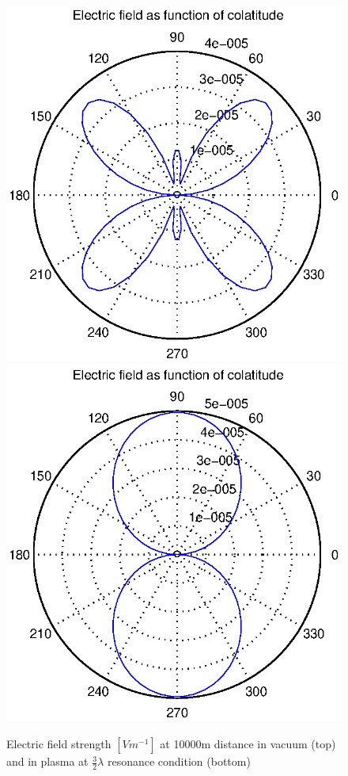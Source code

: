 \documentclass[a4paper,11pt]{thesis}
\begin{document}
\begin{figure}
\begin{center}
  \includegraphics[width=11.5cm]{DissPics/NFvac10000m3halbelambdaMHz.eps}
\includegraphics[width=11.5cm]{DissPics/NFvac10000m3halbelambdaMHz_p.eps}
  \caption{Electric field strength $[Vm^{-1}]$ at 10000m distance in vacuum (top) and in plasma at $\frac{3}{2}\lambda$ resonance condition (bottom)}\label{fig:NF3halbelambdaMHz}
\end{center}
\end{figure}
\end{document}
